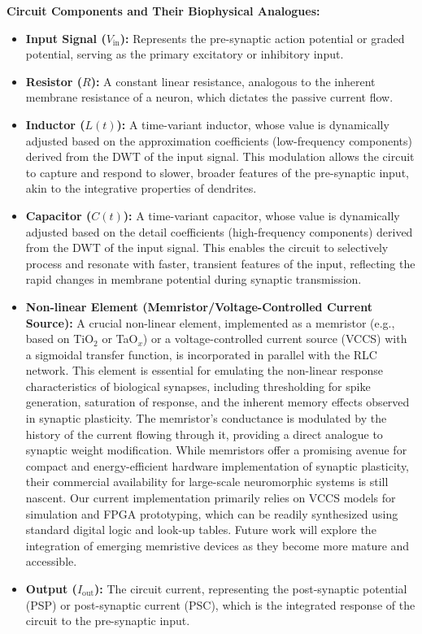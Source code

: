 \documentclass[a4paper,12pt]{article}
\begin{document}
\textbf{Circuit Components and Their Biophysical Analogues:}
\begin{itemize}
    \item \textbf{Input Signal ($V_{\text{in}}$):} Represents the pre-synaptic action potential or graded potential, serving as the primary excitatory or inhibitory input.
    \item \textbf{Resistor ($R$):} A constant linear resistance, analogous to the inherent membrane resistance of a neuron, which dictates the passive current flow.
    \item \textbf{Inductor ($L(t)$):} A time-variant inductor, whose value is dynamically adjusted based on the approximation coefficients (low-frequency components) derived from the DWT of the input signal. This modulation allows the circuit to capture and respond to slower, broader features of the pre-synaptic input, akin to the integrative properties of dendrites.
    \item \textbf{Capacitor ($C(t)$):} A time-variant capacitor, whose value is dynamically adjusted based on the detail coefficients (high-frequency components) derived from the DWT of the input signal. This enables the circuit to selectively process and resonate with faster, transient features of the input, reflecting the rapid changes in membrane potential during synaptic transmission.
    \item \textbf{Non-linear Element (Memristor/Voltage-Controlled Current Source):} A crucial non-linear element, implemented as a memristor (e.g., based on TiO$_2$ or TaO$_x$) or a voltage-controlled current source (VCCS) with a sigmoidal transfer function, is incorporated in parallel with the RLC network. This element is essential for emulating the non-linear response characteristics of biological synapses, including thresholding for spike generation, saturation of response, and the inherent memory effects observed in synaptic plasticity. The memristor's conductance is modulated by the history of the current flowing through it, providing a direct analogue to synaptic weight modification. While memristors offer a promising avenue for compact and energy-efficient hardware implementation of synaptic plasticity, their commercial availability for large-scale neuromorphic systems is still nascent. Our current implementation primarily relies on VCCS models for simulation and FPGA prototyping, which can be readily synthesized using standard digital logic and look-up tables. Future work will explore the integration of emerging memristive devices as they become more mature and accessible.
    \item \textbf{Output ($I_{\text{out}}$):} The circuit current, representing the post-synaptic potential (PSP) or post-synaptic current (PSC), which is the integrated response of the circuit to the pre-synaptic input.
\end{itemize}
\end{document}
